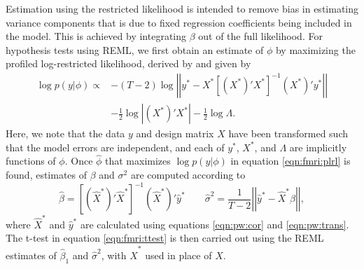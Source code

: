 Estimation using the restricted likelihood is intended to remove bias in estimating variance components that is due to fixed regression coefficients being included in the model. This is achieved by integrating $\beta$ out of the full likelihood. For hypothesis tests using REML, we first obtain an estimate of $\phi$ by maximizing the profiled log-restricted likelihood, derived by \citet{harville:reml:1977} and given by
\begin{align}
\log p(y|\phi) \propto & -(T-2)\log\left|\left| y^* - X^*\left[(X^*)'X^*\right]^{-1}(X^*)'y^* \right|\right| \label{eqn:fmri:plrl} \\
 & - \frac{1}{2}\log\left|(X^*)'X^*\right| - \frac{1}{2} \log \Lambda. \nonumber
\end{align}
Here, we note that the data $y$ and design matrix $X$ have been transformed such that the model errors are independent, and each of $y^*$, $X^*$, and $\Lambda$ are implicitly functions of $\phi$. Once $\hat{\phi}$ that maximizes $\log p(y|\phi)$ in equation \eqref{eqn:fmri:plrl} is found, estimates of $\beta$ and $\sigma^2$ are computed according to
\begin{equation}
\hat{\beta} = \left[(\hat{X}^*)'\hat{X}^*\right]^{-1}(\hat{X}^*)'\hat{y}^* \qquad \hat{\sigma}^2 = \frac{1}{T-2}\left|\left| \hat{y}^*-\hat{X}^*\hat{\beta} \right|\right|, \label{eqn:fmri:reml}
\end{equation}
where $\hat{X}^*$ and $\hat{y}^*$ are calculated using equations \eqref{eqn:pw:cor} and \eqref{eqn:pw:trans}. The t-test in equation \eqref{eqn:fmri:ttest} is then carried out using the REML estimates of $\hat{\beta}_1$ and $\hat{\sigma}^2$, with $\hat{X}^*$ used in place of $X$.


